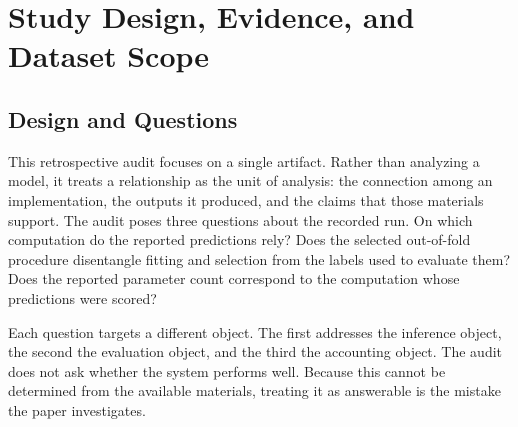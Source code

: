 \documentclass[runningheads]{llncs}
\begin{document}


\section{Study Design, Evidence, and Dataset Scope}
\label{sec:design}

\subsection{Design and Questions}

This retrospective audit focuses on a single artifact. Rather than analyzing a model, it treats a relationship as the unit of analysis: the connection among an implementation, the outputs it produced, and the claims that those materials support. The audit poses three questions about the recorded run. On which computation do the reported predictions rely? Does the selected out-of-fold procedure disentangle fitting and selection from the labels used to evaluate them? Does the reported parameter count correspond to the computation whose predictions were scored?

Each question targets a different object. The first addresses the inference object, the second the evaluation object, and the third the accounting object. The audit does not ask whether the system performs well. Because this cannot be determined from the available materials, treating it as answerable is the mistake the paper investigates.
\end{document}
